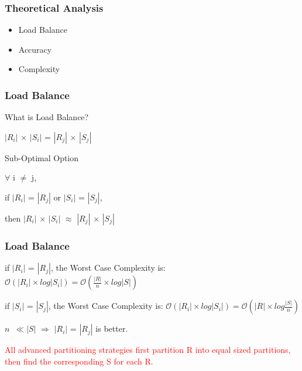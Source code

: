 \begin{frame}
\frametitle{Theoretical Analysis}
\begin{itemize}
\item Load Balance
\item Accuracy
\item Complexity
\end{itemize}
\end{frame}

\begin{frame}
\frametitle{Load Balance}
\begin{block}{What is Load Balance?}
\begin{center}
$\left| R_i \right|$ $\times$ $\left| S_i \right|$ = $\left| R_j \right|$ $\times$ $\left| S_j \right|$
\end{center}
\end{block}

\begin{block}{Sub-Optimal Option}
\begin{center}
$\forall$ i $\neq$ j, 

if $\left| R_i \right|$ = $\left| R_j \right|$ or $\left| S_i \right|$ = $\left| S_j \right|$, 

then $\left| R_i \right|$ $\times$ $\left| S_i \right|$ $\approx$ $\left| R_j \right|$ $\times$ $\left| S_j \right|$
\end{center}
\end{block}

\end{frame}


\begin{frame}
\frametitle{Load Balance}
\vspace{-0.1in}
\begin{block}{if $\left| R_i \right|$ = $\left| R_j \right|$, the Worst Case Complexity is:}
$\mathcal{O}\left(\left|R_i\right| \times log\left|S_i\right|\right) = \mathcal{O}\left(\frac{\left|R\right|}{n} \times log\left|S\right|\right)$
\end{block}
\vspace{-0.2in}
\begin{block}{if $\left| S_i \right|$ = $\left| S_j \right|$, the Worst Case Complexity is:}
$\mathcal{O}\left(\left|R_i\right| \times log\left|S_i\right|\right) = \mathcal{O}\left(\left|R\right|\times log\frac{\left|S\right|}{n}\right)$
\end{block}
\vspace{-0.2in}
$n$~$\ll \left|S\right|$ $\Rightarrow$ $\left| R_i \right|$ = $\left| R_j \right|$ is better.

\textcolor{red}{All advanced partitioning strategies first partition R into equal sized partitions, then find the corresponding S for each R.}
\end{frame}


